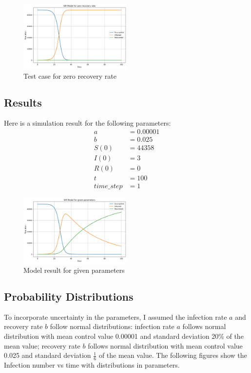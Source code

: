\documentclass[11pt]{article}
\begin{document}
\begin{figure}[H]
    \centering
    \includegraphics[width=0.5\textwidth]{zero_recovery}
    \caption{Test case for zero recovery rate}
    \label{zero_recovery}
\end{figure}

\subsection{Results}
Here is a simulation result for the following parameters:
$$
\begin{aligned}
    a & = 0.00001 \\
    b & = 0.025 \\
    S(0) & = 44358 \\
    I(0) & = 3 \\
    R(0) & = 0 \\
    t & = 100 \\
    time\_step & = 1
\end{aligned}
$$

\begin{figure}[H]
    \centering
    \includegraphics[width=0.5\textwidth]{given_parameters}
    \caption{Model result for given parameters}
    \label{given_parameters}
\end{figure}


\subsection{Probability Distributions}
To incorporate uncertainty in the parameters, I assumed the infection rate $a$ and recovery rate $b$ follow normal distributions: infection rate $a$ follows normal distribution with mean control value 0.00001 and standard deviation 20\% of the mean value; recovery rate $b$ follows normal distribution with mean control value 0.025 and standard deviation $\frac{1}{6}$ of the mean value. The following figures show the Infection number vs time with distributions in parameters.
\end{document}
